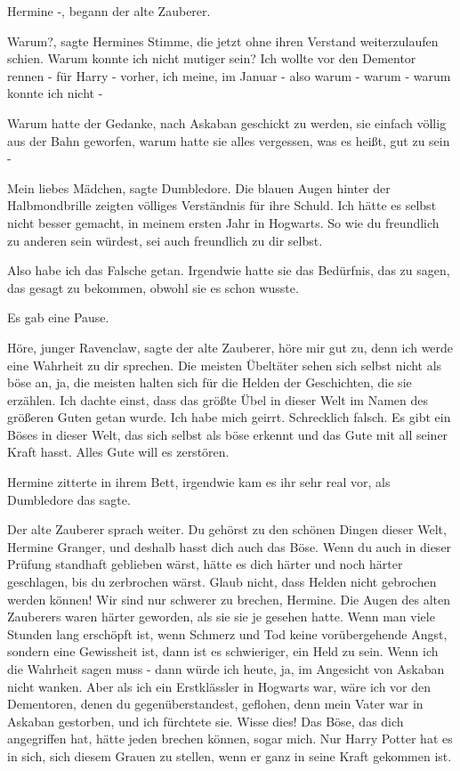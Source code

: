 \glqq{}Hermine -\grqq{}, begann der alte Zauberer.

\glqq{}Warum?\grqq{}, sagte Hermines Stimme, die jetzt ohne ihren Verstand
weiterzulaufen schien. \glqq{}Warum konnte ich nicht mutiger sein? Ich wollte vor
den Dementor rennen - für Harry - vorher, ich meine, im Januar - also warum -
warum - warum konnte ich nicht -\grqq{}

Warum hatte der Gedanke, nach Askaban geschickt zu werden, sie einfach völlig
aus der Bahn geworfen, warum hatte sie alles vergessen, was es heißt, gut zu
sein -

\glqq{}Mein liebes Mädchen\grqq{}, sagte Dumbledore. Die blauen Augen hinter der
Halbmondbrille zeigten völliges Verständnis für ihre Schuld. \glqq{}Ich hätte es
selbst nicht besser gemacht, in meinem ersten Jahr in Hogwarts. So wie du
freundlich zu anderen sein würdest, sei auch freundlich zu dir selbst.\grqq{}

\glqq{}Also habe ich das Falsche getan.\grqq{} Irgendwie hatte sie das Bedürfnis,
das zu sagen, das gesagt zu bekommen, obwohl sie es schon wusste.

Es gab eine Pause.

\glqq{}Höre, junger Ravenclaw\grqq{}, sagte der alte Zauberer, \glqq{}höre mir gut
zu, denn ich werde eine Wahrheit zu dir sprechen. Die meisten Übeltäter sehen
sich selbst nicht als böse an, ja, die meisten halten sich für die Helden der
Geschichten, die sie erzählen. Ich dachte einst, dass das größte Übel in dieser
Welt im Namen des größeren Guten getan wurde. Ich habe mich geirrt. Schrecklich
falsch. Es gibt ein Böses in dieser Welt, das sich selbst als böse erkennt und
das Gute mit all seiner Kraft hasst. Alles Gute will es zerstören.\grqq{}

Hermine zitterte in ihrem Bett, irgendwie kam es ihr sehr real vor, als
Dumbledore das sagte.

Der alte Zauberer sprach weiter. \glqq{}Du gehörst zu den schönen Dingen dieser
Welt, Hermine Granger, und deshalb hasst dich auch das Böse. Wenn du auch in
dieser Prüfung standhaft geblieben wärst, hätte es dich härter und noch härter
geschlagen, bis du zerbrochen wärst. Glaub nicht, dass Helden nicht gebrochen
werden können! Wir sind nur schwerer zu brechen, Hermine.\grqq{} Die Augen des
alten Zauberers waren härter geworden, als sie sie je gesehen hatte. \glqq{}Wenn
man viele Stunden lang erschöpft ist, wenn Schmerz und Tod keine vorübergehende
Angst, sondern eine Gewissheit ist, dann ist es schwieriger, ein Held zu sein.
Wenn ich die Wahrheit sagen muss - dann würde ich heute, ja, im Angesicht von
Askaban nicht wanken. Aber als ich ein Erstklässler in Hogwarts war, wäre ich
vor den Dementoren, denen du gegenüberstandest, geflohen, denn mein Vater war in
Askaban gestorben, und ich fürchtete sie. Wisse dies! Das Böse, das dich
angegriffen hat, hätte jeden brechen können, sogar mich. Nur Harry Potter hat es
in sich, sich diesem Grauen zu stellen, wenn er ganz in seine Kraft gekommen
ist.\grqq{}

